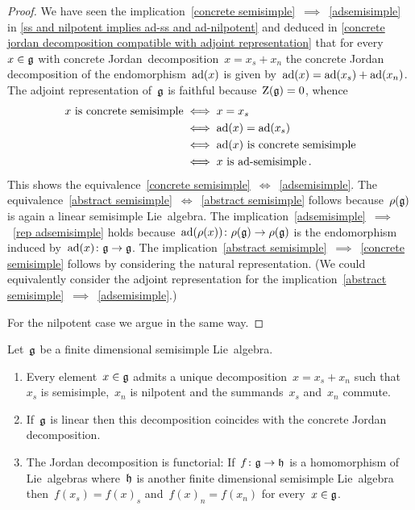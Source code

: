 \begin{proof}
  We have seen the implication~\ref*{concrete semisimple}~$\implies$~\ref*{adsemisimple} in \cref{ss and nilpotent implies ad-ss and ad-nilpotent} and deduced in \cref{concrete jordan decomposition compatible with adjoint representation} that for every~$x \in \mathfrak{g}$ with concrete Jordan~decomposition~$x = x_s + x_n$ the concrete Jordan decomposition of the endomorphism~$\operatorname{ad}(x)$ is given by~$\operatorname{ad}(x) = \operatorname{ad}(x_s) + \operatorname{ad}(x_n)$.
  The adjoint representation of~$\mathfrak{g}$ is faithful because~$\operatorname{Z}(\mathfrak{g}) = 0$, whence
  \begin{align*}
    \text{$x$ is concrete semisimple}
    &\iff
    x = x_s
    \\
    &\iff
    \ad(x) = \ad(x_s)
    \\
    &\iff
    \text{$\ad(x)$ is concrete semisimple}
    \\
    &\iff
    \text{$x$ is~{\adsemisimple}} \,.
  \end{align*}
  This shows the equivalence~\ref*{concrete semisimple}~$\iff$~\ref*{adsemisimple}.
  The equivalence~\ref*{abstract semisimple}~$\iff$~\ref*{abstract semisimple} follows because~$\rho(\mathfrak{g})$ is again a linear semisimple Lie~algebra.
  The implication~\ref*{adsemisimple}~$\implies$~\ref*{rep adsemisimple} holds because~$\operatorname{ad}(\rho(x)) \colon \rho(\mathfrak{g}) \to \rho(\mathfrak{g})$ is the endomorphism induced by~$\operatorname{ad}(x) \colon \mathfrak{g} \to \mathfrak{g}$.
  The implication~\ref*{abstract semisimple}~$\implies$~\ref*{concrete semisimple} follows by considering the natural representation.
  (We could equivalently consider the adjoint representation for the implication~\ref*{abstract semisimple}~$\implies$~\ref*{adsemisimple}.)
  
  For the nilpotent case we argue in the same way.
\end{proof}


\begin{theorem}
  \label{abstract jordan decomposition}
  Let~$\mathfrak{g}$ be a finite dimensional semisimple Lie~algebra.
  \begin{enumerate}
    \item
      \label{existence of unique jd}
      Every element~$x \in \mathfrak{g}$ admits a unique decomposition~$x = x_s + x_n$ such that~$x_s$ is semisimple,~$x_n$ is nilpotent and the summands~$x_s$ and~$x_n$ commute.
    \item
      \label{abstract and concrete jd coincide}
      If~$\mathfrak{g}$ is linear then this decomposition coincides with the concrete Jordan decomposition.
    \item
      \label{functoriality of jordan decomposition}
      The Jordan decomposition is functorial:
      If~$f \colon \mathfrak{g} \to \mathfrak{h}$ is a homomorphism of Lie~algebras where~$\mathfrak{h}$ is another finite dimensional semisimple Lie~algebra then~$f(x_s) = f(x)_s$ and~$f(x)_n = f(x_n)$ for every~$x \in \mathfrak{g}$.
  \end{enumerate}
\end{theorem}


